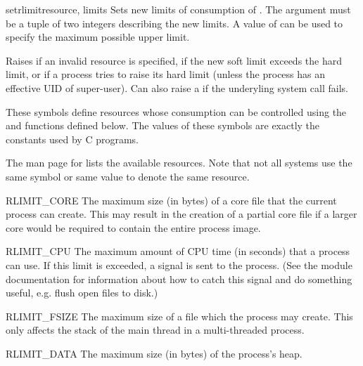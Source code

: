 \begin{funcdesc}{setrlimit}{resource, limits}
  Sets new limits of consumption of . The 
  argument must be a tuple  of two
  integers describing the new limits. A value of  can be used to
  specify the maximum possible upper limit.

  Raises  if an invalid resource is specified, if the new
  soft limit exceeds the hard limit, or if a process tries to raise its
  hard limit (unless the process has an effective UID of
  super-user). Can also raise a  if the
  underyling system call fails.
\end{funcdesc}

These symbols define resources whose consumption can be controlled
using the  and  functions defined
below. The values of these symbols are exactly the constants used
by C programs.

The \UNIX{} man page for  lists the available
resources.  Note that not all systems use the same symbol or same
value to denote the same resource.

\begin{datadesc}{RLIMIT_CORE}
  The maximum size (in bytes) of a core file that the current process
  can create.  This may result in the creation of a partial core file
  if a larger core would be required to contain the entire process
  image.
\end{datadesc}

\begin{datadesc}{RLIMIT_CPU}
  The maximum amount of CPU time (in seconds) that a process can
  use. If this limit is exceeded, a  signal is sent to
  the process. (See the  module documentation for
  information about how to catch this signal and do something useful,
  e.g. flush open files to disk.)
\end{datadesc}

\begin{datadesc}{RLIMIT_FSIZE}
  The maximum size of a file which the process may create.  This only
  affects the stack of the main thread in a multi-threaded process.
\end{datadesc}

\begin{datadesc}{RLIMIT_DATA}
  The maximum size (in bytes) of the process's heap.
\end{datadesc}

